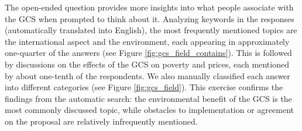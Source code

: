 The open-ended question provides more insights into what people associate with the GCS when prompted to think about it. %
Analyzing keywords in the responses (automatically translated into English), the most frequently mentioned topics are the international aspect and the environment, each appearing in approximately one-quarter of the answers (see Figure \ref{fig:gcs_field_contains}). This is followed by discussions on the effects of the GCS on poverty and prices, each mentioned by about one-tenth of the respondents. We also manually classified each answer into different categories (see Figure \ref{fig:gcs_field}). This exercise confirms the findings from the automatic search: the environmental benefit of the GCS is the most commonly discussed topic, while obstacles to implementation or agreement on the proposal are relatively infrequently mentioned.%

